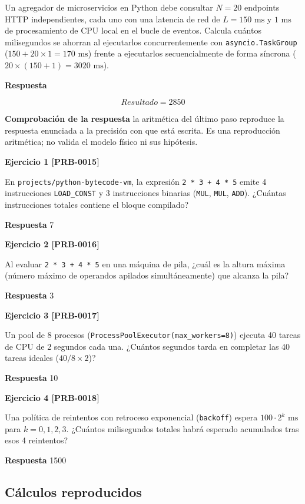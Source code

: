 \documentclass{book}
\begin{document}
Un agregador de microservicios en Python debe consultar \(N = 20\) endpoints HTTP independientes, cada uno con una latencia de red de \(L = 150\text{ ms}\) y \(1\text{ ms}\) de procesamiento de CPU local en el bucle de eventos. Calcula cuántos milisegundos se ahorran al ejecutarlos concurrentemente con \texttt{asyncio.TaskGroup} (\(150 + 20 \times 1 = 170\text{ ms}\)) frente a ejecutarlos secuencialmente de forma síncrona (\(20 \times (150 + 1) = 3020\text{ ms}\)).

\noindent\textbf{Respuesta}

\[
Resultado = 2850
\]

\noindent\textbf{Comprobación de la respuesta} la aritmética del último paso reproduce la respuesta enunciada a la precisión con que está escrita. Es una reproducción aritmética; no valida el modelo físico ni sus hipótesis.

\noindent\textbf{Ejercicio 1 [PRB-0015]}

En \texttt{projects/python-bytecode-vm}, la expresión \texttt{2 * 3 + 4 * 5} emite 4 instrucciones \texttt{LOAD\_CONST} y 3 instrucciones binarias (\texttt{MUL}, \texttt{MUL}, \texttt{ADD}). ¿Cuántas instrucciones totales contiene el bloque compilado?

\noindent\textbf{Respuesta} 7

\noindent\textbf{Ejercicio 2 [PRB-0016]}

Al evaluar \texttt{2 * 3 + 4 * 5} en una máquina de pila, ¿cuál es la altura máxima (número máximo de operandos apilados simultáneamente) que alcanza la pila?

\noindent\textbf{Respuesta} 3

\noindent\textbf{Ejercicio 3 [PRB-0017]}

Un pool de 8 procesos (\texttt{ProcessPoolExecutor(max\_workers=8)}) ejecuta 40 tareas de CPU de 2 segundos cada una. ¿Cuántos segundos tarda en completar las 40 tareas ideales (\(40 / 8 \times 2\))?

\noindent\textbf{Respuesta} 10

\noindent\textbf{Ejercicio 4 [PRB-0018]}

Una política de reintentos con retroceso exponencial (\texttt{backoff}) espera \(100 \cdot 2^k\text{ ms}\) para \(k = 0, 1, 2, 3\). ¿Cuántos milisegundos totales habrá esperado acumulados tras esos 4 reintentos?

\noindent\textbf{Respuesta} 1500

\subsection*{Cálculos reproducidos}
\end{document}
